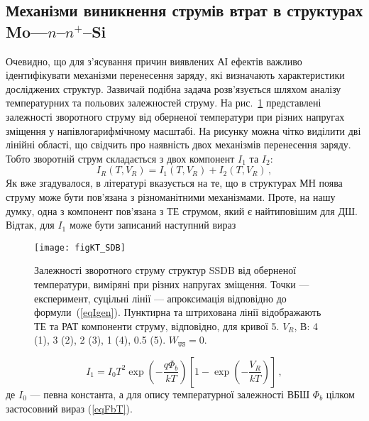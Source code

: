 \subsection{Механізми виникнення струмів втрат в структурах Mo---$n$--$n^+$--Si\label{LeakCur}}

Очевидно, що для з'ясування причин виявлених АІ ефектів важливо ідентифікувати
механізми перенесення заряду, які визначають характеристики досліджених структур.
Зазвичай подібна задача розв'язується шляхом аналізу температурних та польових залежностей струму.
На рис.~\ref{figKT_SDB} представлені залежності зворотного струму від оберненої температури при різних напругах зміщення
у напівлогарифмічному масштабі.
На рисунку можна чітко виділити дві лінійні області, що свідчить про наявність двох механізмів
перенесення заряду.
Тобто зворотній струм складається з двох компонент $I_{1}$ та $I_2$:
\begin{equation}\label{eqIsum}
    I_R(T,V_R)=I_1(T,V_R)+I_2(T,V_R)\,,
\end{equation}
Як вже згадувалося, в літературі вказується на те, що в структурах МН поява струму може бути пов'язана з
різноманітними механізмами.
Проте, на нашу думку, одна з компонент пов'язана з ТЕ струмом, який є найтиповішим для ДШ.
Відтак, для $I_1$ може бути записаний наступний вираз

\begin{figure}
\center
\texttt{[image: figKT\_SDB]}
\caption{\label{figKT_SDB}
Залежності зворотного струму структур SSDB від оберненої температури,
виміряні при різних напругах зміщення.
Точки --- експеримент,
суцільні лінії --- апроксимація відповідно до формули~(\ref{eqIgen}).
Пунктирна та штрихована лінії відображають ТЕ та РАТ компоненти струму, відповідно, для кривої 5.
$V_R$, В: 4 (1), 3 (2), 2 (3), 1 (4), 0.5 (5).
$W_\mathtt{US}=0$.
}%
\end{figure}

\begin{equation}\label{eqIte_SDB}
    I_1=I_0T^2\exp\left(-\frac{q\Phi_b}{kT}\right)\left[1-\exp\left(-\frac{V_R}{kT}\right)\right]\,,
\end{equation}
де $I_0$ --- певна константа,
а для опису температурної залежності ВБШ $\Phi_b$ цілком застосовний вираз (\ref{eqFbT}).

